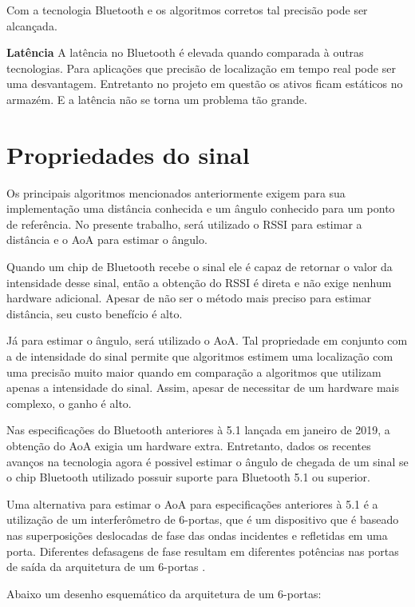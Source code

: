 Com a tecnologia Bluetooth e os algoritmos corretos tal precisão pode ser alcançada.\newline

\textbf{Latência}\newline
A latência no Bluetooth é elevada quando comparada à outras tecnologias. Para aplicações que precisão de localização em tempo real pode ser uma desvantagem. Entretanto no projeto em questão os ativos ficam estáticos no armazém. E a latência não se torna um problema tão grande.\newline

\section{Propriedades do sinal}
Os principais algoritmos mencionados anteriormente exigem para sua implementação uma distância conhecida e um ângulo conhecido para um ponto de referência. No presente trabalho, será utilizado o RSSI para estimar a distância e o AoA para estimar o ângulo.

Quando um chip de Bluetooth recebe o sinal ele é capaz de retornar o valor da intensidade desse sinal, então a obtenção do RSSI é direta e não exige nenhum hardware adicional. Apesar de não ser o método mais preciso para estimar distância, seu custo benefício é alto.

Já para estimar o ângulo, será utilizado o AoA. Tal propriedade em conjunto com a de intensidade do sinal permite que algoritmos estimem uma localização com uma precisão muito maior quando em comparação a algoritmos que utilizam apenas a intensidade do sinal. Assim, apesar de necessitar de um hardware mais complexo, o ganho é alto.

Nas especificações do Bluetooth anteriores à 5.1 lançada em janeiro de 2019, a obtenção do AoA exigia um hardware extra.
Entretanto, dados os recentes avanços na tecnologia agora é possivel estimar o ângulo de chegada de um sinal se o chip Bluetooth utilizado possuir suporte para Bluetooth 5.1 ou superior.

Uma alternativa para estimar o AoA para especificações anteriores à 5.1 é a utilização de um interferômetro de 6-portas, que é um dispositivo que é baseado nas superposições deslocadas de fase das ondas incidentes e refletidas em uma porta. Diferentes defasagens de fase resultam em diferentes potências nas portas de saída da arquitetura de um 6-portas \cite{art14}.

Abaixo um desenho esquemático da arquitetura de um 6-portas: 

